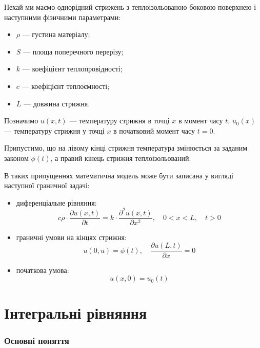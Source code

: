 \begin{example}
	Нехай ми маємо однорідний стрижень з теплоізольованою боковою поверхнею і наступними фізичними параметрами:
	\begin{itemize}
		\item $\rho$ --- густина матеріалу;
		\item $S$ --- площа поперечного перерізу;
		\item $k$ --- коефіцієнт теплопровідності;
		\item $c$ --- коефіцієнт теплоємності;
		\item $L$ --- довжина стрижня.
	\end{itemize}

	Позначимо $u(x, t)$ --- температуру стрижня в точці $x$ в момент часу $t$, $u_0(x)$ --- температуру стрижня у точці $x$ в початковий момент часу $t = 0$. \medskip

	Припустимо, що на лівому кінці стрижня температура змінюється за заданим законом $\phi(t)$, а правий кінець стрижня теплоізольований.
\end{example}

В таких припущеннях математична модель може бути записана у вигляді наступної граничної задачі:

\begin{itemize}
	\item диференціальне рівняння:
	\begin{equation}
		c \rho \cdot \dfrac{\partial u(x, t)}{\partial t} = k \cdot \dfrac{\partial^2 u(x, t)}{\partial x^2}, \quad 0 < x < L, \quad t > 0
	\end{equation}
	\item граничні умови на кінцях стрижня:
	\begin{equation}
		u(0, u) = \phi(t), \quad  \dfrac{\partial u(L, t)}{\partial x} = 0
	\end{equation}
	\item початкова умова:
	\begin{equation}
		u(x, 0) = u_0(t)
	\end{equation}
\end{itemize}

\section{Інтегральні рівняння}

\subsubsection{Основні поняття}

